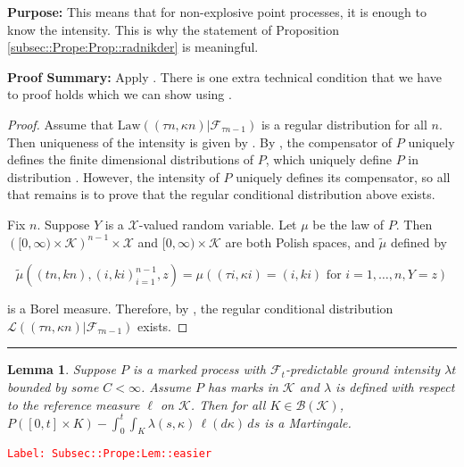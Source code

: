 \documentclass[12pt]{article}
\newcommand{\mc}{\mathcal}
\newcommand{\ms}{\mathscr}
\newcommand{\te}{\text}
\newcommand{\tr}{\textcolor{red}}
\newcommand{\labe}[1]{\tr{\texttt{Label: #1}}}
\newcommand{\purpose}{\textbf{Purpose: }}
\newcommand{\pfsum}{\textbf{Proof Summary: }}
\newcommand{\ind}{\hspace{24pt}}
\newcommand{\lin}{\rule{\linewidth}{0.4 pt}}
\renewcommand{\S}{S}							%
\renewcommand{\t}{t}							%
\renewcommand{\tt}{s}							%
\newcommand{\F}{\mc{F}}							%
\newcommand{\ts}[1]{_{#1}}						%
\newcommand{\const}{C}							%
\newcommand{\Sm}{\ell}							%
\newcommand{\rate}{\lambda}						%
\newcommand{\alt}[1]{\widetilde{#1}}			%
\newcommand{\m}{\mu}							%
\newcommand{\law}{\te{Law}}						%
\newcommand{\XX}{Y}								%
\newcommand{\rt}{\tau}							%
\renewcommand{\mark}{\kappa}					%
\newcommand{\rp}{P}								%
\newcommand{\spce}{\mc{X}}						%
\newcommand{\xxx}{z}							%
\newcommand{\mspce}{\mc{K}}						%
\newtheorem{lem}[thms]{Lemma}
\begin{document}
\purpose This means that for non-explosive point processes, it is enough to know the intensity. This is why the statement of Proposition \ref{subsec::Prope:Prop::radnikder} is meaningful.

\pfsum Apply \cite[Propositions 14.3.II(b),14.2.IV(c) and 9.2.III]{DalVer08}. There is one extra technical condition that we have to proof holds which we can show using \cite[Proposition A1.5.III]{DalVer03}.

\begin{proof}
Assume that \(\law((\rt{n},\mark{n})|\F\ts{\rt{n-1}})\) is a regular distribution for all \(n\). Then uniqueness of the intensity is given by \cite[Proposition 14.3.II (b)]{DalVer08}. By \cite[Proposition 14.2.IV (c)]{DalVer08}, the compensator of \(\rp\) uniquely defines the finite dimensional distributions of \(\rp\), which uniquely define \(\rp\) in distribution \cite[Proposition 9.2.III]{DalVer08}. However, the intensity of \(\rp\) uniquely defines its compensator, so all that remains is to prove that the regular conditional distribution above exists.

\ind Fix \(n\). Suppose \(\XX\) is a \(\spce\)-valued random variable. Let \(\m\) be the law of \(\rp\). Then \(\left([0,\infty)\times \mspce\right)^{n-1}\times\spce\) and \([0,\infty)\times \mspce\) are both Polish spaces, and \(\alt{\m}\) defined by 

\[\alt{\m}((\t{n},k{n}),(	{i},k{i})_{i=1}^{n-1},\xxx) = \m\left((\rt{i},\mark{i}) = (	{i},k{i})\te{ for } i=1,\dots,n, \XX = \xxx\right)\]

is a Borel measure. Therefore, by \cite[Proposition A1.5.III]{DalVer03}, the regular conditional distribution \(\ms{L}((\rt{n},\mark{n})|\F\ts{\rt{n-1}})\) exists.
\end{proof}


\lin

\begin{lem}
Suppose \(\rp\) is a marked process with \(\F\ts{\t}\)-predictable ground intensity \(\rate{\t}\) bounded by some \(\const < \infty\). Assume \(\rp\) has marks in \(\mspce\) and \(\rate\) is defined with respect to the reference measure \(\Sm\) on \(\mspce\). Then for all \(K \in \ms{B}(\mspce)\), \(\rp([0,\t]\times K) - \int_0^\t\int_K \rate(\tt,\mark)\,\ell(d\mark)\,ds\) is a Martingale.
\label{Subsec::Prope:Lem::easier}
\end{lem}
\labe{Subsec::Prope:Lem::easier}
\end{document}
